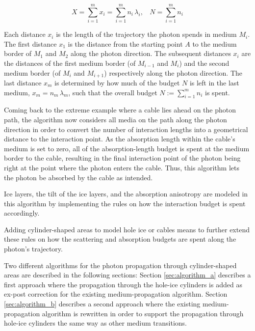 \begin{equation}
  X = \sum_{i=1}^m x_i = \sum_{i=1}^m n_i\,\lambda_i, \ \ \ \ N = \sum_{i=1}^m n_i
  \label{eq:convertbudgettodistance}
\end{equation}

Each distance $x_i$ is the length of the trajectory the photon spends in medium $M_i$. The first distance $x_1$ is the distance from the starting point $A$ to the medium border of $M_1$ and $M_2$ along the photon direction. The subsequent distances $x_i$ are the distances of the first medium border (of $M_{i-1}$ and $M_i$) and the second medium border (of $M_i$ and $M_{i+1}$) respectively along the photon direction. The last distance $x_m$ is determined by how much of the budget $N$ is left in the last medium, $x_m = n_m\,\lambda_m$, such that the overall budget $N:=\sum_{i=1}^m n_i$ is spent.

Coming back to the extreme example where a cable lies ahead on the photon path, the algorithm now considers all media on the path along the photon direction in order to convert the number of interaction lengths into a geometrical distance to the interaction point. As the absorption length within the cable's medium is set to zero, all of the absorption-length budget is spent at the medium border to the cable, resulting in the final interaction point of the photon being right at the point where the photon enters the cable. Thus, this algorithm lets the photon be absorbed by the cable as intended.

Ice layers, the tilt of the ice layers, and the absorption anisotropy are modeled in this algorithm by implementing the rules on how the interaction budget is spent accordingly.

Adding cylinder-shaped areas to model hole ice or cables means to further extend these rules on how the scattering and absorption budgets are spent along the photon's trajectory.

Two different algorithms for the photon propagation through cylinder-shaped areas are described in the following sections: Section \ref{sec:algorithm_a} describes a first approach where the propagation through the hole-ice cylinders is added as ex-post correction for the existing medium-propagation algorithm. Section \ref{sec:algorithm_b} describes a second approach where the existing medium-propagation algorithm is rewritten in order to support the propagation through hole-ice cylinders the same way as other medium transitions.
